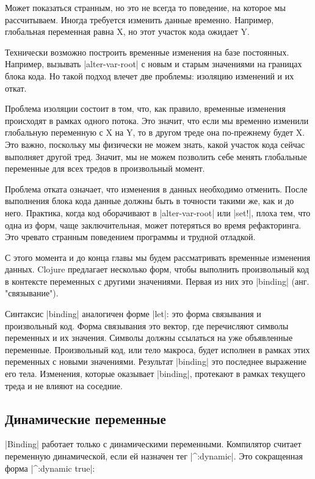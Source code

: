 Может показаться странным, но это не всегда то поведение, на которое мы
рассчитываем. Иногда требуется изменить данные временно. Например, глобальная
переменная равна X, но этот участок кода ожидает Y.

Технически возможно построить временные изменения на базе постоянных. Например,
вызывать \spverb|alter-var-root| с новым и старым значениями на границах блока кода. Но
такой подход влечет две проблемы: изоляцию изменений и их откат.

Проблема изоляции состоит в том, что, как правило, временные изменения
происходят в рамках одного потока. Это значит, что если мы временно изменили
глобальную переменную с X на Y, то в другом треде она по-прежнему будет X. Это
важно, поскольку мы физически не можем знать, какой участок кода сейчас
выполняет другой тред. Значит, мы не можем позволить себе менять глобальные
переменные для всех тредов в произвольный момент.

Проблема отката означает, что изменения в данных необходимо отменить. После
выполнения блока кода данные должны быть в точности такими же, как и до
него. Практика, когда код оборачивают в \spverb|alter-var-root| или \spverb|set!|, плоха тем,
что одна из форм, чаще заключительная, может потеряться во время
рефакторинга. Это чревато странным поведением программы и трудной отладкой.

С этого момента и до конца главы мы будем рассматривать временные изменения
данных. Clojure предлагает несколько форм, чтобы выполнить произвольный код в
контексте переменных с другими значениями. Первая из них это \spverb|binding|
(анг. "связывание").

Синтаксис \spverb|binding| аналогичен форме \spverb|let|: это форма связывания и произвольный
код. Форма связывания это вектор, где перечисляют символы переменных и их
значения. Символы должны ссылаться на уже объявленные переменные. Произвольный
код, или тело макроса, будет исполнен в рамках этих переменных с новыми
значениями. Результат \spverb|binding| это последнее выражение его тела. Изменения,
которые оказывает \spverb|binding|, протекают в рамках текущего треда и не влияют на
соседние.

\subsection{Динамические переменные}

\spverb|Binding| работает только с динамическими переменными. Компилятор считает
переменную динамической, если ей назначен тег \spverb|^:dynamic|. Это сокращенная форма
\spverb|^{:dynamic true}|:

